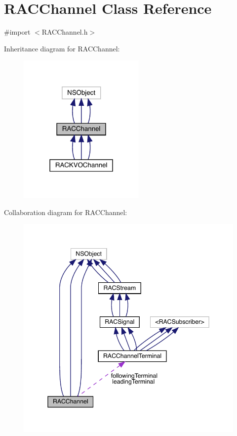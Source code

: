 \hypertarget{interface_r_a_c_channel}{}\section{R\+A\+C\+Channel Class Reference}
\label{interface_r_a_c_channel}


{\ttfamily \#import $<$R\+A\+C\+Channel.\+h$>$}



Inheritance diagram for R\+A\+C\+Channel\+:\nopagebreak
\begin{figure}[H]
\begin{center}
\leavevmode
\includegraphics[width=175pt]{interface_r_a_c_channel__inherit__graph}
\end{center}
\end{figure}


Collaboration diagram for R\+A\+C\+Channel\+:\nopagebreak
\begin{figure}[H]
\begin{center}
\leavevmode
\includegraphics[width=345pt]{interface_r_a_c_channel__coll__graph}
\end{center}
\end{figure}
